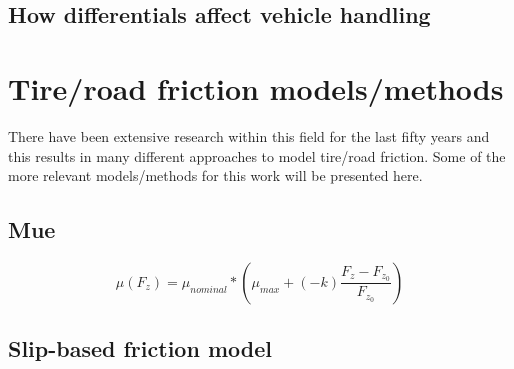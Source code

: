 \subsection{How differentials affect vehicle handling} 

\section{Tire/road friction models/methods}

There have been extensive research within this field for the last fifty years and this results in many different approaches to model tire/road friction. Some of the more relevant models/methods for this work will be presented here.

\subsection{Mue}

\begin{equation}
	\mu(F_{z})=\mu_{nominal}*(\mu_{max} + (-k)\frac{F_{z} - F_{z_{0}}}{F_{z_{0}}})
\end{equation}

\subsection{Slip-based friction model}
